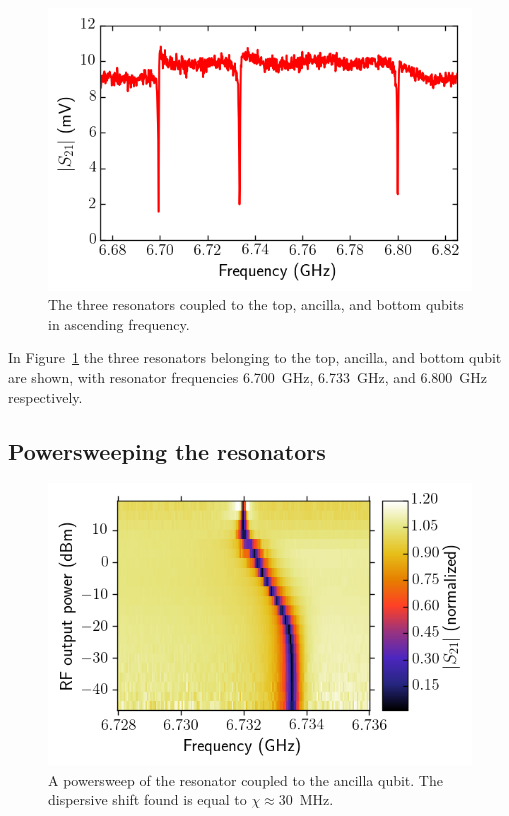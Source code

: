        \begin{figure}[tb]
          \centering
          \includegraphics[width=.7\textwidth]{../Figures/Qubit characterization/Resonator scans.png}
          \caption{The three resonators coupled to the top, ancilla, and bottom qubits in ascending frequency.}
          \label{fig:Three resonators}
        \end{figure}

        In Figure~\ref{fig:Three resonators} the three resonators belonging to the top, ancilla, and bottom qubit are shown, with resonator frequencies \SI{6.700}{\giga \hertz}, \SI{6.733}{\giga \hertz}, and \SI{6.800}{\giga \hertz} respectively.

      \subsection{Powersweeping the resonators}
        \label{ssec:powersweep}

        \begin{figure}
          \begin{center}
          \vspace{-30pt}
            \includegraphics[width=\textwidth]{../Figures/Qubit characterization/Powersweep.png}
          \end{center}
          \vspace{-20 pt}
          \caption{A powersweep of the resonator coupled to the ancilla qubit. The dispersive shift found is equal to $\chi\approx$\SI{30}{\mega \hertz}.}
          \label{fig:powersweep}
        \end{figure}


